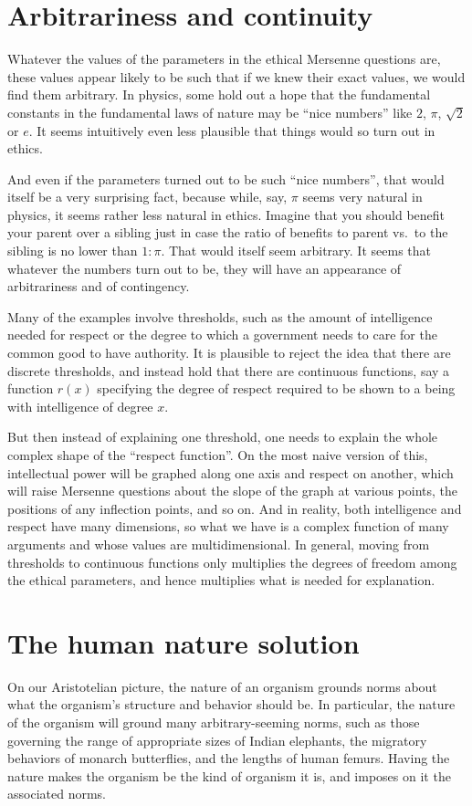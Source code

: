 \section{Arbitrariness and continuity}
Whatever the values of the parameters in the ethical Mersenne questions are, these values appear likely to be such 
that if we knew their exact values, we would find them arbitrary.
In physics, some hold out a hope that the fundamental constants in the fundamental laws of nature may be ``nice numbers'' like
$2$, $\pi$, $\sqrt 2$ or $e$. It seems intuitively even less plausible that things would so turn out in ethics. 

And even if the parameters turned out to be such ``nice numbers'', that would itself be a very surprising fact, because while, say,
$\pi$ seems very natural in physics, it seems rather less natural in ethics. Imagine that you should benefit your 
parent over a sibling just in case the ratio of benefits to parent vs.\ to the sibling is no lower than $1:\pi$. That would itself seem arbitrary.
It seems that whatever the numbers turn out to be, they will have an appearance of arbitrariness and of contingency.

Many of the examples involve thresholds, such as the amount of intelligence needed for respect or the degree to which a government
needs to care for the common good to have authority. It is plausible to reject the idea that there are discrete thresholds, and instead hold 
that there are continuous functions, say a function $r(x)$ specifying the degree of respect required to be shown to a being with intelligence
of degree $x$. 

But then instead of explaining one threshold, one needs to
explain the whole complex shape of the ``respect function''. On the most naive version of this, intellectual power will be graphed along one axis
and respect on another, which will raise Mersenne questions about the slope of the graph at various points, the positions of any inflection points, and so on. 
And in reality, both intelligence and respect have many dimensions, so what we have is a complex function of many arguments and whose
values are multidimensional. In general, moving from thresholds to continuous functions only multiplies the degrees of freedom
among the ethical parameters, and hence multiplies what is needed for explanation.

\section{The human nature solution}
On our Aristotelian picture, the nature of an organism grounds norms about what the organism's structure and behavior 
should be. In particular, the nature of the organism will ground many arbitrary-seeming norms, such as those governing
the range of appropriate sizes of Indian elephants, the migratory behaviors of monarch butterflies, and the lengths of 
human femurs. Having the nature makes the organism be the kind of organism it is, and imposes on it the associated norms.

